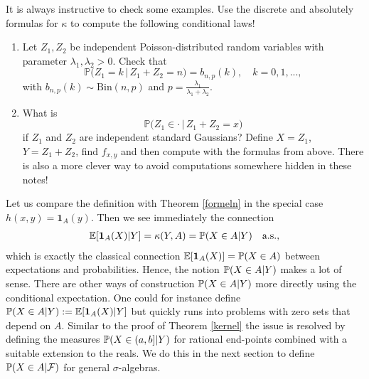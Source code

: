 It is always instructive to check some examples. Use the discrete and absolutely formulas for $\kappa$ to compute the following conditional laws!
\begin{luebung}
\begin{enumerate}[label=(\roman*)]
\item Let $Z_1,Z_2$ be independent Poisson-distributed random variables with parameter $\lambda_1,\lambda_2 > 0$. Check that \[ \mathbb{P}\big(Z_1 = k \,\big|\, Z_1+Z_2 = n \big) = b_{n,p}(k),\quad k=0,1,...,\]  with $b_{n,p}(k)\sim \mathrm{Bin}(n,p)$ and $p=\frac{\lambda_1}{\lambda_1+\lambda_2}$.
\item What is  \[\mathbb{P}\big(Z_1\in \cdot \, | \, Z_1+Z_2 = x \big) \] if $Z_1$ and $Z_2$ are independent standard Gaussians? Define $X=Z_1$, $Y=Z_1+Z_2$, find $f_{x,y}$ and then compute with the formulas from above. There is also a more clever way to avoid computations somewhere hidden in these notes!
\end{enumerate}
\end{luebung}


Let us compare the definition with Theorem \ref{formeln} in the special case $h(x,y)=\mathbf 1_A(y)$. Then we see immediately the connection
\begin{align*}
	\E[\mathbf 1_A(X)|Y]=\kappa(Y,A)=\P(X\in A|Y)\quad \text{a.s.},
\end{align*}
which is exactly the classical connection $\E[\mathbf 1_A(X)]=\P(X\in A)$ between expectations and probabilities. Hence, the notion $\P(X\in A|Y)$ makes a lot of sense. There are other ways of construction $\P(X\in A|Y)$ more directly using the conditional expectation. One could for instance define $\P(X\in A|Y):=\E[\mathbf 1_A(X)|Y]$ but quickly runs into problems with zero sets that depend on $A$. Similar to the proof of Theorem \ref{kernel} the issue is resolved by defining the measures $\P(X\in (a,b]|Y)$ for rational end-points combined with a suitable extension to the reals. We do this in the next section to define $\P(X\in A|\mathcal F)$ for general $\sigma$-algebras.\smallskip

